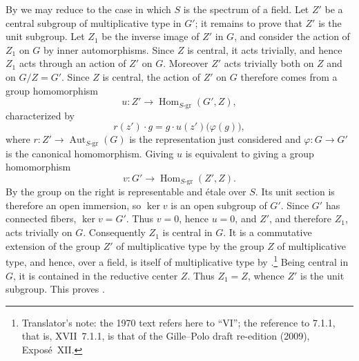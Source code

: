 By  we may reduce to the case in which \(S\) is the spectrum of a
field. Let \(Z'\) be a central subgroup of multiplicative type in
\(G'\); it remains to prove that \(Z'\) is the unit subgroup. Let
\(Z_1\) be the inverse image of \(Z'\) in \(G\), and consider the
action of \(Z_1\) on \(G\) by inner automorphisms. Since \(Z\) is
central, it acts trivially, and hence \(Z_1\) acts through an action
of \(Z'\) on \(G\). Moreover \(Z'\) acts trivially both on \(Z\) and
on \(G/Z=G'\). Since \(Z\) is central, the action of \(Z'\) on \(G\)
therefore comes from a group homomorphism
\[
  u:Z'\longrightarrow
    \operatorname{Hom}_{S\text{-}\mathrm{gr}}(G',Z),
\]
characterized by
\[
  r(z')\cdot g
    =g\cdot u(z')\bigl(\varphi(g)\bigr),
\]
where \(r:Z'\to\operatorname{Aut}_{S\text{-}\mathrm{gr}}(G)\) is
the representation just considered and \(\varphi:G\to G'\) is the
canonical homomorphism. Giving \(u\) is equivalent to giving a group
homomorphism
\[
  v:G'\longrightarrow
    \operatorname{Hom}_{S\text{-}\mathrm{gr}}(Z',Z).
\]
By  the group on the right is representable and étale over
\(S\). Its unit section is therefore an open immersion, so
\(\ker v\) is an open subgroup of \(G'\). Since \(G'\) has connected
fibers, \(\ker v=G'\). Thus \(v=0\), hence \(u=0\), and \(Z'\), and
therefore \(Z_1\), acts trivially on \(G\). Consequently \(Z_1\) is
central in \(G\). It is a commutative extension of the group \(Z'\)
of multiplicative type by the group \(Z\) of multiplicative type,
and hence, over a field, is itself of multiplicative type by .\footnote{Translator's
note: the 1970 text refers here to ``VI''; the reference to 7.1.1, that
is, XVII~7.1.1, is that of the Gille--Polo draft re-edition (2009),
Exposé~XII.}
Being central in \(G\), it is contained in the reductive center
\(Z\). Thus \(Z_1=Z\), whence \(Z'\) is the unit subgroup. This
proves \textup{}.


